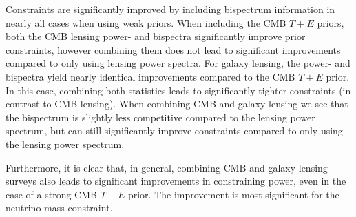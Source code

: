 \documentclass[11pt]{article} %
\begin{document}
Constraints are significantly improved by including bispectrum information in nearly all cases when using weak priors. When including the CMB $T+E$ priors, both the CMB lensing power- and bispectra significantly improve prior constraints, however combining them does not lead to significant improvements compared to only using lensing power spectra. For galaxy lensing, the power- and bispectra yield nearly identical improvements compared to the CMB $T+E$ prior. In this case, combining both statistics leads to significantly tighter constraints (in contrast to CMB lensing). When combining CMB and galaxy lensing we see that the bispectrum is slightly less competitive compared to the lensing power spectrum, but can still significantly improve constraints compared to only using the lensing power spectrum.

Furthermore, it is clear that, in general, combining CMB and galaxy lensing surveys also leads to significant improvements in constraining power, even in the case of a strong CMB $T+E$ prior. The improvement is most significant for the neutrino mass constraint.
\end{document}
